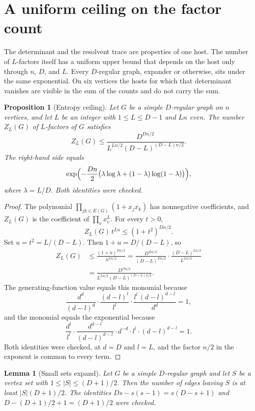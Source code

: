 \documentclass[11pt]{article}
\newtheorem{lemma}[theorem]{Lemma}
\newtheorem{proposition}[theorem]{Proposition}
\begin{document}
\section{A uniform ceiling on the factor count}
\label{sec:ceiling}

The determinant and the resolvent trace are properties of one host.
The number of \(L\)-factors itself has a uniform upper bound that depends
on the host only through \(n\), \(D\), and \(L\).
Every \(D\)-regular graph, expander or otherwise, sits under the same
exponential.
On six vertices the hosts for which that determinant vanishes are visible in
the sum of the counts and do not carry the sum.

\begin{proposition}[Entropy ceiling]
\label{prop:entropy-ceiling}
Let \(G\) be a simple \(D\)-regular graph on \(n\) vertices, and let \(L\) be an
integer with \(1\le L\le D-1\) and \(Ln\) even.
The number \(Z_L(G)\) of \(L\)-factors of \(G\) satisfies
\[
Z_L(G)
\le
\frac{D^{Dn/2}}{L^{Ln/2}(D-L)^{(D-L)n/2}}.
\]
The right-hand side equals
\[
\exp\Bigl(-\frac{Dn}{2}\bigl(\lambda\log\lambda+(1-\lambda)\log(1-\lambda)\bigr)\Bigr),
\]
where \(\lambda=L/D\).
Both identities were checked.
\end{proposition}

\begin{proof}
The polynomial \(\prod_{jk\in E(G)}(1+x_j x_k)\) has nonnegative coefficients,
and \(Z_L(G)\) is the coefficient of \(\prod_v x_v^L\).
For every \(t>0\),
\[
Z_L(G)\,t^{Ln}
\le
(1+t^2)^{Dn/2}.
\]
Set \(u=t^2=L/(D-L)\). Then \(1+u=D/(D-L)\), so
\begin{align*}
Z_L(G)
&\le
\frac{(1+u)^{Dn/2}}{u^{Ln/2}}
=
\frac{D^{Dn/2}}{(D-L)^{Dn/2}}\cdot\frac{(D-L)^{Ln/2}}{L^{Ln/2}}\\
&=
\frac{D^{Dn/2}}{L^{Ln/2}(D-L)^{(D-L)n/2}}.
\end{align*}
The generating-function value equals this monomial because
\[
\frac{d^{d}}{(d-l)^{d}}\cdot\frac{(d-l)^{l}}{l^{l}}\cdot\frac{l^{l}\,(d-l)^{d-l}}{d^{d}}
=1,
\]
and the monomial equals the exponential because
\[
\frac{d^{l}}{l^{l}}\cdot\frac{d^{d-l}}{(d-l)^{d-l}}\cdot d^{-d}\cdot l^{l}\cdot(d-l)^{d-l}
=1.
\]
Both identities were checked, at \(d=D\) and \(l=L\), and the factor \(n/2\) in
the exponent is common to every term.
\end{proof}

\begin{lemma}[Small sets expand]
\label{lem:small-set-expand}
Let \(G\) be a simple \(D\)-regular graph and let \(S\) be a vertex set with
\(1\le |S|\le (D+1)/2\).
Then the number of edges leaving \(S\) is at least \(|S|(D+1)/2\).
The identities \(Ds-s(s-1)=s(D-s+1)\) and \(D-(D+1)/2+1=(D+1)/2\) were
checked.
\end{lemma}
\end{document}
